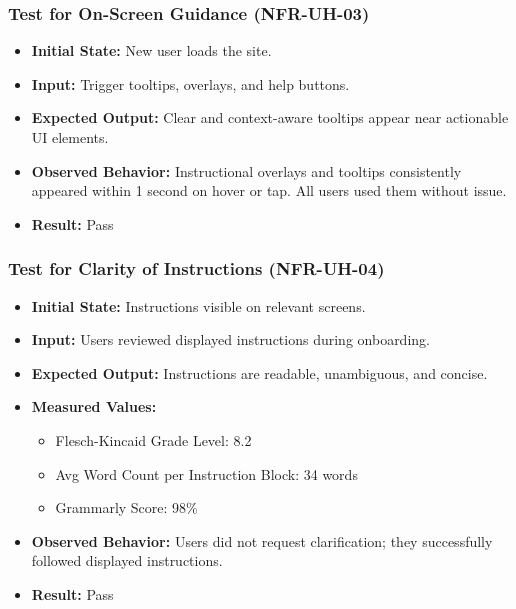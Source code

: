 \documentclass[12pt, titlepage]{article}
\begin{document}
\subsubsection{Test for On-Screen Guidance (NFR-UH-03)}
\begin{itemize}
    \item \textbf{Initial State:} New user loads the site.
    \item \textbf{Input:} Trigger tooltips, overlays, and help buttons.
    \item \textbf{Expected Output:} Clear and context-aware tooltips appear near actionable UI elements.
    \item \textbf{Observed Behavior:} Instructional overlays and tooltips consistently appeared within 1 second on hover or tap. All users used them without issue.
    \item \textbf{Result:} Pass
\end{itemize}

\subsubsection{Test for Clarity of Instructions (NFR-UH-04)}
\begin{itemize}
    \item \textbf{Initial State:} Instructions visible on relevant screens.
    \item \textbf{Input:} Users reviewed displayed instructions during onboarding.
    \item \textbf{Expected Output:} Instructions are readable, unambiguous, and concise.
    \item \textbf{Measured Values:}
    \begin{itemize}
        \item Flesch-Kincaid Grade Level: 8.2
        \item Avg Word Count per Instruction Block: 34 words
        \item Grammarly Score: 98\%
    \end{itemize}
    \item \textbf{Observed Behavior:} Users did not request clarification; they successfully followed displayed instructions.
    \item \textbf{Result:} Pass
\end{itemize}
\end{document}
